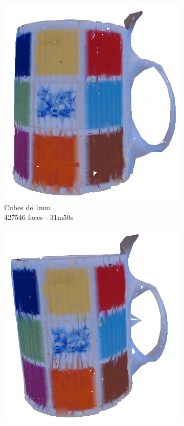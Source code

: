 \documentclass[a4paper,10pt]{report}
\begin{document}
\begin{figure}[h!]
\begin{subfigure}[b]{0.3\textwidth}
	    \includegraphics[width=\textwidth]{results/vs1-ipd.png}
        \caption{Cubes de 1mm\\427546 faces - 31m50s}
    \end{subfigure}
    \begin{subfigure}[b]{0.3\textwidth}
	    \includegraphics[width=\textwidth]{results/nodp-ipd.png}

\end{subfigure}
\end{figure}
\end{document}
